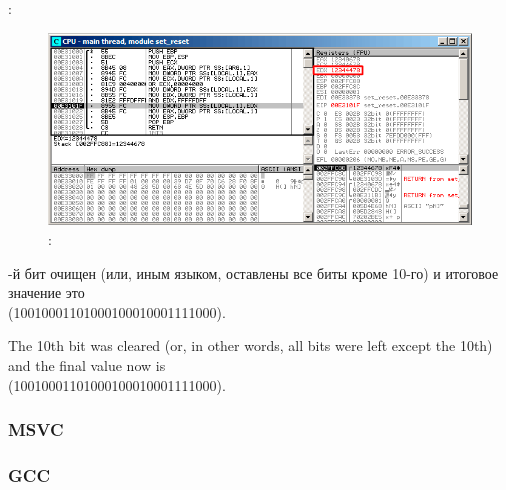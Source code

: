 \clearpage
\AND {}:

\begin{figure}[H]
\centering
\includegraphics[scale=\FigScale]{patterns/14_bitfields/2_set_reset/olly4.png}
\caption{\olly: \AND {}}
\label{fig:set_reset_olly4}
\end{figure}

\ifdefined{}-й бит очищен (или, иным языком, оставлены все биты кроме 10-го) и итоговое значение это \\
 (1001000110100010001{\color{red}0}001111000).
\fi %

\ifdefined\ENGLISH
The 10th bit was cleared (or, in other words, all bits were left except the 10th) and the final value now is \\
 (1001000110100010001{\color{red}0}001111000).
\fi %

\subsubsection{\Optimizing MSVC}




\subsubsection{\NonOptimizing GCC}




